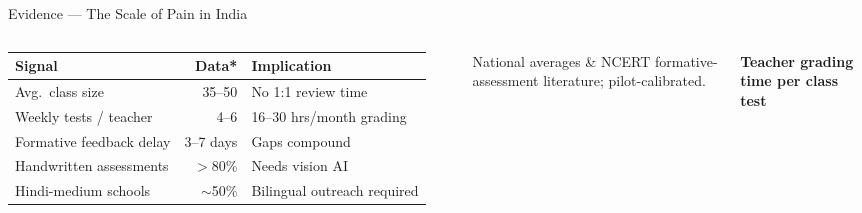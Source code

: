 \documentclass[aspectratio=169,10pt]{beamer}
\begin{document}
\begin{frame}{Evidence — The Scale of Pain in India}
  \begin{columns}
    \footnotesize
    \begin{tabular}{@{}lrl@{}}
      \toprule
      \textbf{Signal} & \textbf{Data*} & \textbf{Implication} \\
      \midrule
      Avg.\ class size & 35–50 & No 1:1 review time \\
      Weekly tests / teacher & 4–6 & 16–30 hrs/month grading \\
      Formative feedback delay & 3–7 days & Gaps compound \\
      Handwritten assessments & $>$80\% & Needs vision AI \\
      Hindi-medium schools & $\sim$50\% & Bilingual outreach required \\
      \bottomrule
    \end{tabular}
    \tiny *National averages \& NCERT formative-assessment literature; pilot-calibrated.

    \footnotesize\centering\textbf{Teacher grading time per class test}
  \end{columns}
\end{frame}
\end{document}
